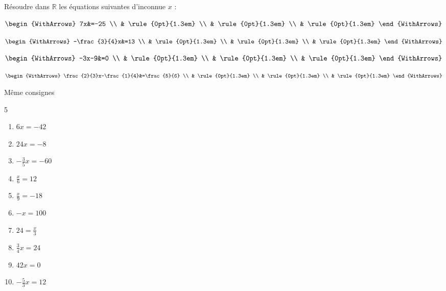 \documentclass[main.tex]{subfiles}
\begin{document}
\begin{example}  Résoudre dans $\mathbb{R}$ les équations suivantes d'inconnue $x$ :\hfill 
	
	\noindent \parbox{0.23\linewidth}{	
		$\begin{WithArrows}
			7x&=-25 \\
			&  \rule{0pt}{1.3em}   \\
			&  \rule{0pt}{1.3em}   \\
			&  \rule{0pt}{1.3em}    
		\end{WithArrows}$ 	
	}\hfill \parbox{0.23\linewidth}{	
		$\begin{WithArrows}
			-\frac{3}{4}x&=13 \\
			&  \rule{0pt}{1.3em}   \\
			&  \rule{0pt}{1.3em}   \\
			&  \rule{0pt}{1.3em}   
		\end{WithArrows}$ 
	} \hfill \parbox{0.23\linewidth}{	
		$\begin{WithArrows}
			-3x-9&=0 \\
			&  \rule{0pt}{1.3em}   \\
			&  \rule{0pt}{1.3em}   \\
			&  \rule{0pt}{1.3em}   
		\end{WithArrows}$ 
	}  \hfill \parbox{0.23\linewidth}{	
		$\begin{WithArrows}
			\frac{2}{3}x-\frac{1}{4}&=\frac{5}{6} \\
			&  \rule{0pt}{1.3em}   \\
			&  \rule{0pt}{1.3em}   \\
			&  \rule{0pt}{1.3em}    
		\end{WithArrows}$ 
	}   
\end{example}
\begin{exercise}\label{chapter07:exercice:equation01} Même consignes
	\vspace{-1em} 
	
	\begin{multicols}{5}
		\begin{enumerate}[label={$(E_{\arabic*})$}, leftmargin=*]
			\item $6x=-42$
			\item $24x=-8$
			\item $-\tfrac{3}{5}x=-60$
			\item $\tfrac{x}{6}=12$
			\item $\tfrac{x}{9}=-18$
			\item $-x=100$
			\item $24=\tfrac{x}{3}$
			\item $\tfrac{3}{4}x=24$
			\item $42x=0$
			\item $-\tfrac{5}{3}x=12$ 
		\end{enumerate}
	\end{multicols}  
\end{exercise}
\vspace{-1em} 
\end{document}
